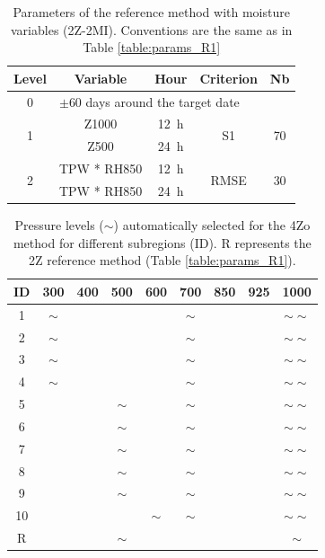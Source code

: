 \documentclass[review]{elsarticle}
\begin{document}
\begin{table}[t]
	\caption{Parameters of the reference method with moisture variables (2Z-2MI). Conventions are the same as in Table \ref{table:params_R1}}
	\footnotesize
	\begin{center}
		\begin{tabular}{ccccc}
			\hline 
			Level & Variable & Hour & Criterion & Nb \\ 
			\hline 
			0 & \multicolumn{4}{l}{$\pm 60$ days around the target date} \\
			\hline 
			\multirow{2}{*}{1} & Z1000 & 12~h & \multirow{2}{*}{S1} & \multirow{2}{*}{70} \\
			& Z500 & 24~h & & \\ 
			\hline
			\multirow{2}{*}{2} & TPW * RH850 & 12~h & \multirow{2}{*}{RMSE} & \multirow{2}{*}{30} \\
			& TPW * RH850 & 24~h & & \\ 
			\hline 
		\end{tabular} 
	\end{center}
	\label{table:params_R2}
\end{table}

\begin{table}[t]
	\caption{Pressure levels ($\sim$) automatically selected for the 4Zo method for different subregions (ID). R represents the 2Z reference method (Table \ref{table:params_R1}).}
	\footnotesize
	\begin{center}
		\begin{tabular}{ccccccccc}
			\hline ID & 300 & 400 & 500 & 600 & 700 & 850 & 925 & 1000 \\ 
			\hline 
			1  & $\sim$ &   &   &   & $\sim$ &   &   & $\sim \sim$ \\
			2  & $\sim$ &   &   &   & $\sim$ &   &   & $\sim \sim$ \\
			3  & $\sim$ &   &   &   & $\sim$ &   &   & $\sim \sim$ \\
			4  & $\sim$ &   &   &   & $\sim$ &   &   & $\sim \sim$ \\
			5  &   &   & $\sim$ &   & $\sim$ &   &   & $\sim \sim$ \\
			6  &   &   & $\sim$ &   & $\sim$ &   &   & $\sim \sim$ \\
			7  &   &   & $\sim$ &   & $\sim$ &   &   & $\sim \sim$ \\
			8  &   &   & $\sim$ &   & $\sim$ &   &   & $\sim \sim$ \\
			9  &   &   & $\sim$ &   & $\sim$ &   &   & $\sim \sim$ \\
			10 &   &   &   & $\sim$ & $\sim$ &   &   & $\sim \sim$ \\
			\hline 	
			R  &   &   & $\sim$ &   &   &   &   & $\sim$ \\
			\hline 
		\end{tabular} 
	\end{center}
	\label{table:levels_GA_4Zo}
\end{table}
\end{document}

